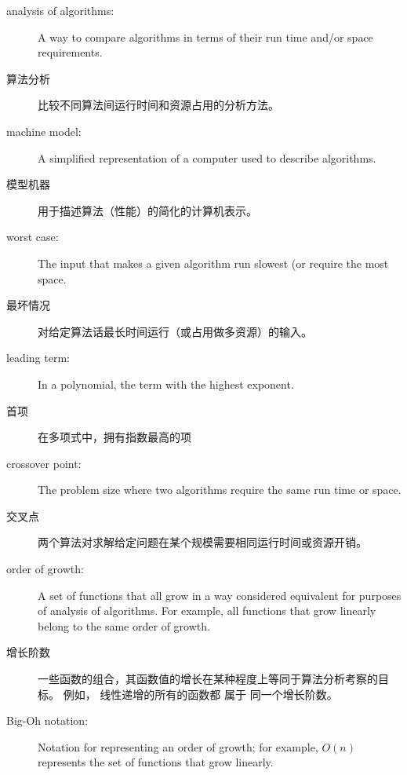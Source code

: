 \begin{description}

\item[]

\item[analysis of algorithms:] A way to compare algorithms in terms of
their run time and/or space requirements.

\item[算法分析] 比较不同算法间运行时间和资源占用的分析方法。

\item[machine model:] A simplified representation of a computer used
to describe algorithms.

\item[模型机器] 用于描述算法（性能）的简化的计算机表示。

\item[worst case:] The input that makes a given algorithm run slowest (or
require the most space.

\item[最坏情况] 对给定算法话最长时间运行（或占用做多资源）的输入。

\item[leading term:] In a polynomial, the term with the highest exponent.

\item[首项] 在多项式中，拥有指数最高的项

\item[crossover point:] The problem size where two algorithms require
the same run time or space.

\item[交叉点] 两个算法对求解给定问题在某个规模需要相同运行时间或资源开销。

\item[order of growth:] A set of functions that all grow in a way
considered equivalent for purposes of analysis of algorithms.
For example, all functions that grow linearly belong to the same
order of growth.

\item [增长阶数] 一些函数的组合，其函数值的增长在某种程度上等同于算法分析考察的目标。 例如， 线性递增的所有的函数都 属于 同一个增长阶数。

\item[Big-Oh notation:] Notation for representing an order of growth;
for example, $O(n)$ represents the set of functions that grow
linearly.


\end{description}
